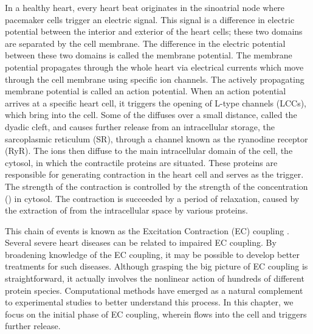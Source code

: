 In a healthy heart, every heart beat originates in the sinoatrial node
where pacemaker cells trigger an electric signal. This signal is a
difference in electric potential between the interior and exterior of
the heart cells; these two domains are separated by the cell
membrane. The difference in the electric potential between these two
domains is called the membrane potential. The membrane potential
propagates through the whole heart via electrical currents which move
through the cell membrane using specific ion channels. The actively
propagating membrane potential is called an action potential. When an
action potential arrives at a specific heart cell, it triggers the
opening of L-type \Ca channels (LCCs), which bring \Ca into the
cell. Some of the \Ca diffuses over a small distance, called the
dyadic cleft, and causes further \Ca release from an intracellular \Ca
storage, the sarcoplasmic reticulum (SR), through a channel known as
the ryanodine receptor (RyR). The \Ca ions then diffuse to the main
intracellular domain of the cell, the cytosol, in which the
contractile proteins are situated. These proteins are responsible for
generating contraction in the heart cell and \Ca serves as the
trigger. The strength of the contraction is controlled by the strength
of the \Ca concentration (\CaC) in cytosol. The contraction is
succeeded by a period of relaxation, caused by the extraction of \Ca
from the intracellular space by various proteins.

This chain of events is known as the Excitation Contraction (EC)
coupling \citep{Bers2001}. Several severe heart diseases can be related
to impaired EC coupling. By broadening knowledge of the EC coupling,
it may be possible to develop better treatments for such
diseases. Although grasping the big picture of EC coupling is
straightforward, it actually involves the nonlinear action of hundreds
of different protein species. Computational methods have emerged as a
natural complement to experimental studies to better understand this
process. In this chapter, we focus on the initial phase of EC
coupling, wherein \Ca flows into the cell and triggers further \Ca
release.

